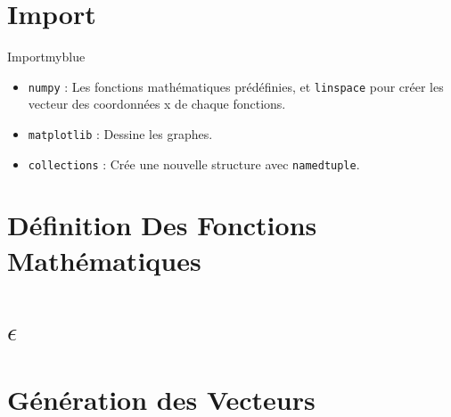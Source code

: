 \newpage
{}

\setcounter{section}{0}

\vspace{0.25cm}


\section{Import}
\begin{prettyBox}{Import}{myblue}
\begin{itemize}
    \item \texttt{numpy} : Les fonctions mathématiques prédéfinies, et \texttt{linspace} pour créer  
        les vecteur des coordonnées x de chaque fonctions.  
    \item \texttt{matplotlib} : Dessine les graphes.  
    \item \texttt{collections} : Crée une nouvelle structure avec \texttt{namedtuple}.  
\end{itemize}
\end{prettyBox}
\vspace{0.5cm}


\vspace{1cm}

\section{Définition Des Fonctions Mathématiques}


\vspace{1cm}
\section{\(\epsilon\)}


\vspace{1cm}
\section{Génération des Vecteurs}


\newpage
